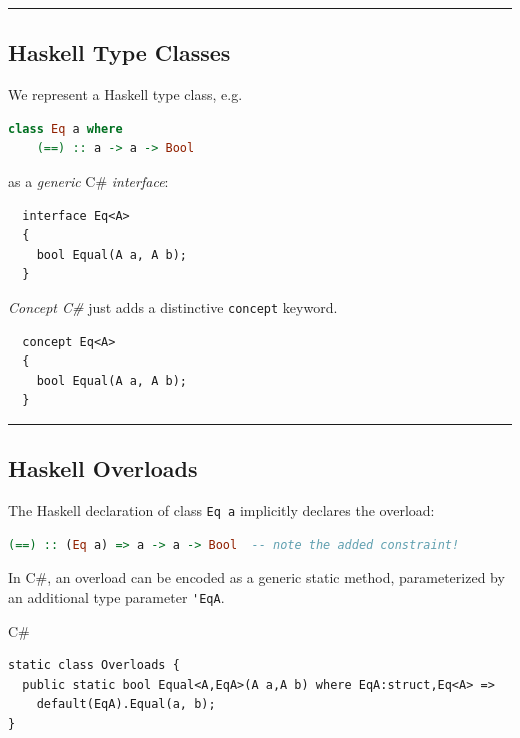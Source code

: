 \begin{center}\rule{0.5\linewidth}{\linethickness}\end{center}

\subsection{Haskell Type Classes}\label{haskell-type-classes}

We represent a Haskell type class, e.g.

\begin{lstlisting}[language=Haskell]
  class Eq a where 
    (==) :: a -> a -> Bool
\end{lstlisting}

as a \emph{generic} C\# \emph{interface}:

\begin{lstlisting}
  interface Eq<A>
  {
    bool Equal(A a, A b);
  }
\end{lstlisting}

\emph{Concept C\#} just adds a distinctive \lstinline!concept! keyword.

\begin{lstlisting}
  concept Eq<A>
  {
    bool Equal(A a, A b);
  }
\end{lstlisting}

\begin{center}\rule{0.5\linewidth}{\linethickness}\end{center}

\subsection{Haskell Overloads}\label{haskell-overloads}

The Haskell declaration of class \lstinline!Eq a! implicitly declares
the overload:

\begin{lstlisting}[language=Haskell]
    (==) :: (Eq a) => a -> a -> Bool  -- note the added constraint!
\end{lstlisting}

In C\#, an overload can be encoded as a generic static method,
parameterized by an additional type parameter \lstinline!'EqA!.

C\#

\begin{lstlisting}
static class Overloads {
  public static bool Equal<A,EqA>(A a,A b) where EqA:struct,Eq<A> =>
    default(EqA).Equal(a, b);
}
\end{lstlisting}


